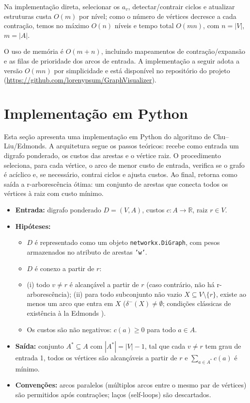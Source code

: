 Na implementação direta, selecionar os \(a_v\), detectar/contrair ciclos e atualizar estruturas custa \(O(m)\) por nível; como o número de vértices decresce a cada contração, temos no máximo \(O(n)\) níveis e tempo total \(O(mn)\), com \(n=|V|\), \(m=|A|\).



O uso de memória é \(O(m+n)\), incluindo mapeamentos de contração/expansão e as filas de prioridade dos arcos de entrada. A implementação a seguir adota a versão \(O(mn)\) por simplicidade e está disponível no repositório do projeto (\url{https://github.com/lorenypsum/GraphVisualizer}).

\section{Implementação em Python}


Esta seção apresenta uma implementação em Python do algoritmo de Chu–Liu/Edmonds. A arquitetura segue os passos teóricos: recebe como entrada um digrafo ponderado, os custos das arestas e o vértice raiz. O procedimento seleciona, para cada vértice, o arco de menor custo de entrada, verifica se o grafo é acíclico e, se necessário, contrai ciclos e ajusta custos. Ao final, retorna como saída a r-arborescência ótima: um conjunto de arestas que conecta todos os vértices à raiz com custo mínimo.

\begin{itemize}\setlength{\itemsep}{2pt}
    \item \textbf{Entrada:} digrafo ponderado \(D=(V,A)\), custos \(c:A\to\mathbb{R}\), raiz \(r\in V\).
    \item \textbf{Hipóteses:}
          \begin{itemize}\setlength{\itemsep}{2pt}
              \item \(D\) é representado como um objeto \texttt{networkx.DiGraph}, com pesos armazenados no atributo de arestas \texttt{'w'}.
              \item \(D\) é conexo a partir de \(r\):
              \item (i) todo \(v\neq r\) é alcançável a partir de \(r\) (caso contrário, não há r-arborescência); (ii) para todo subconjunto não vazio \(X\subseteq V\setminus\{r\}\), existe ao menos um arco que entra em \(X\) (\(\delta^-(X)\neq\emptyset\); condições clássicas de existência \`a la Edmonds \cite{schrijver2003comb}).
              \item Os custos são não negativos: \(c(a)\ge 0\) para todo \(a\in A\).
          \end{itemize}
    \item \textbf{Saída:} conjunto \(A^*\subseteq A\) com \(|A^*|=|V|-1\), tal que cada \(v\neq r\) tem grau de entrada 1, todos os vértices são alcançáveis a partir de \(r\) e \(\sum_{a\in A^*} c(a)\) é mínimo.
    \item \textbf{Convenções:} arcos paralelos (múltiplos arcos entre o mesmo par de vértices) são permitidos após contrações; laços (self-loops) são descartados.
\end{itemize}


